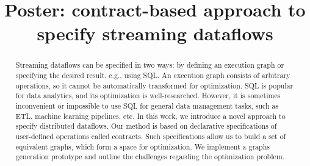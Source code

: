 \documentclass[sigconf]{acmart}
\theoremstyle{remark}
\begin{document}

\title{Poster: contract-based approach to specify streaming dataflows}



\begin{abstract}
    Streaming dataflows can be specified in two ways: by defining an execution graph or specifying the desired result, e.g., using SQL.
    An execution graph consists of arbitrary operations, so it cannot be automatically transformed for optimization.
    SQL is popular for data analytics, and its optimization is well-researched.
    However, it is sometimes inconvenient or impossible to use SQL for general data management tasks, such as ETL, machine learning pipelines, etc.
    In this work, we introduce a novel approach to specify distributed dataflows.
    Our method is based on declarative specifications of user-defined operations called contracts.
    Such specifications allow us to build a set of equivalent graphs, which form a space for optimization.
    We implement a graphs generation prototype and outline the challenges regarding the optimization problem.
\end{abstract}
\end{document}

